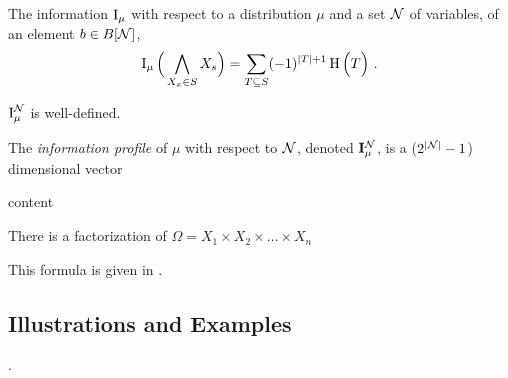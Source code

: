 \documentclass{article}
\begin{document}
    \begin{defn}
        The information $\operatorname{\mathrm{I}}_\mu$ with respect to a distribution $\mu$ and a set $\mathcal N$ of variables, of an element $b \in B[\mathcal N]$,
    \[          \operatorname{\mathrm{I}}_\mu\Big(\bigwedge_{X_x \in S} X_s\Big) =  \sum_{T \subseteq S} (-1)^{|T|+1} \operatorname{\mathrm{H}}\Big( T \Big) ~. \]
    \end{defn}

    \begin{prop}
        $\operatorname{\mathrm{I}}_\mu^\mathcal N$ is well-defined.
    \end{prop}

    \begin{defn}
        The \emph{information profile} of $\mu$ with respect to $\mathcal N$, denoted $\mathbf I_\mu^\mathcal N$, is a ($2^{|\mathcal N|} -1$) dimensional vector
    \end{defn}

    \begin{example}
        content
    \end{example}



    \begin{prop}
        There is a factorization of $\Omega = X_1 \times X_2 \times \ldots \times X_n$
    \end{prop}

    This formula is given in \cite{}.

    \subsection{Illustrations and Examples}.

\end{document}
